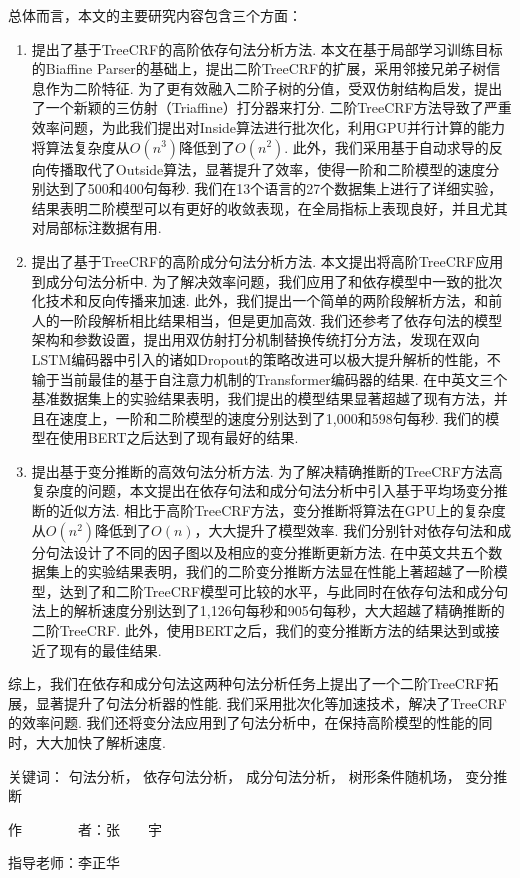 \begin{cabstract}
  总体而言，本文的主要研究内容包含三个方面：
  \begin{enumerate}
    \item 提出了基于TreeCRF的高阶依存句法分析方法.
          本文在基于局部学习训练目标的Biaffine Parser的基础上，提出二阶TreeCRF的扩展，采用邻接兄弟子树信息作为二阶特征.
          为了更有效融入二阶子树的分值，受双仿射结构启发，提出了一个新颖的三仿射（Triaffine）打分器来打分.
          二阶TreeCRF方法导致了严重效率问题，为此我们提出对Inside算法进行批次化，利用GPU并行计算的能力将算法复杂度从$O(n^3)$降低到了$O(n^2)$.
          此外，我们采用基于自动求导的反向传播取代了Outside算法，显著提升了效率，使得一阶和二阶模型的速度分别达到了500和400句每秒.
          我们在13个语言的27个数据集上进行了详细实验，结果表明二阶模型可以有更好的收敛表现，在全局指标上表现良好，并且尤其对局部标注数据有用.
    \item 提出了基于TreeCRF的高阶成分句法分析方法.
          本文提出将高阶TreeCRF应用到成分句法分析中.
          为了解决效率问题，我们应用了和依存模型中一致的批次化技术和反向传播来加速.
          此外，我们提出一个简单的两阶段解析方法，和前人的一阶段解析相比结果相当，但是更加高效.
          我们还参考了依存句法的模型架构和参数设置，提出用双仿射打分机制替换传统打分方法，发现在双向LSTM编码器中引入的诸如Dropout的策略改进可以极大提升解析的性能，不输于当前最佳的基于自注意力机制的Transformer编码器的结果.
          在中英文三个基准数据集上的实验结果表明，我们提出的模型结果显著超越了现有方法，并且在速度上，一阶和二阶模型的速度分别达到了1,000和598句每秒.
          我们的模型在使用BERT之后达到了现有最好的结果.
    \item 提出基于变分推断的高效句法分析方法.
          为了解决精确推断的TreeCRF方法高复杂度的问题，本文提出在依存句法和成分句法分析中引入基于平均场变分推断的近似方法.
          相比于高阶TreeCRF方法，变分推断将算法在GPU上的复杂度从$O(n^2)$降低到了$O(n)$，大大提升了模型效率.
          我们分别针对依存句法和成分句法设计了不同的因子图以及相应的变分推断更新方法.
          在中英文共五个数据集上的实验结果表明，我们的二阶变分推断方法显在性能上著超越了一阶模型，达到了和二阶TreeCRF模型可比较的水平，与此同时在依存句法和成分句法上的解析速度分别达到了1,126句每秒和905句每秒，大大超越了精确推断的二阶TreeCRF.
          此外，使用BERT之后，我们的变分推断方法的结果达到或接近了现有的最佳结果.
  \end{enumerate}

  综上，我们在依存和成分句法这两种句法分析任务上提出了一个二阶TreeCRF拓展，显著提升了句法分析器的性能.
  我们采用批次化等加速技术，解决了TreeCRF的效率问题.
  我们还将变分法应用到了句法分析中，在保持高阶模型的性能的同时，大大加快了解析速度.

  \vskip 21bp
    {\heiti{} 关键词：}
  句法分析，
  依存句法分析，
  成分句法分析，
  树形条件随机场，
  变分推断

  \begin{flushright}
    作~~~~~~~~者：张~~~~宇

    指导老师：李正华

  \end{flushright}
\end{cabstract}



